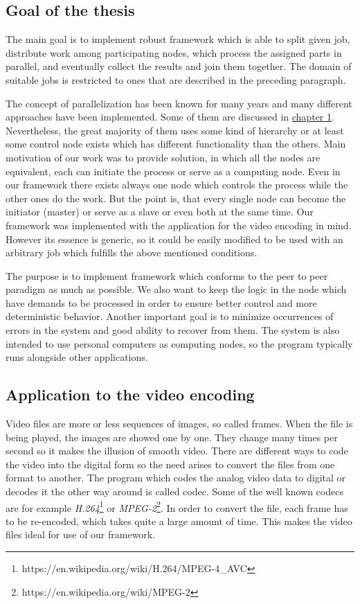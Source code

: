 \subsection*{Goal of the thesis} %
The main goal is to implement robust framework which is able to split given job, distribute work among participating nodes, which process the assigned parts in parallel, and eventually collect the results and join them together. The domain of suitable jobs is restricted to ones that are described in the preceding paragraph.

The concept of parallelization has been known for many years and many different approaches have been implemented. Some of them are discussed in \hyperref[existing-solutions]{chapter 1}. Nevertheless, the great majority of them uses some kind of hierarchy or at least some control node exists which has different functionality than the others. Main motivation of our work was to provide solution, in which all the nodes are equivalent, each can initiate the process or serve as a computing node. Even in our framework there exists always one node which controls the process while the other ones do the work. But the point is, that every single node can become the initiator (master) or serve as a slave or even both at the same time. Our framework was implemented with the application for the video encoding in mind. However its essence is generic, so it could be easily modified to be used with an arbitrary job which fulfills the above mentioned conditions.

The purpose is to implement framework which conforms to the peer to peer paradigm as much as possible. We also want to keep the logic in the node which have demands to be processed in order to ensure better control and more deterministic behavior. Another important goal is to minimize occurrences of errors in the system and good ability to recover from them. The system is also intended to use personal computers as computing nodes, so the program typically runs alongside other applications.


\subsection*{Application to the video encoding}
Video files are more or less sequences of images, so called frames. When the file is being played, the images are showed one by one. They change many times per second so it makes the illusion of smooth video. There are different ways to code the video into the digital form so the need arises to convert the files from one format to another. The program which codes the analog video data to digital or decodes it the other way around is called codec. Some of the well known codecs are for example \textit{H.264}\footnote{https://en.wikipedia.org/wiki/H.264/MPEG-4\_AVC} or \textit{MPEG-2}\footnote{https://en.wikipedia.org/wiki/MPEG-2}. In order to convert the file, each frame has to be re-encoded, which takes quite a large amount of time. This makes the video files ideal for use of our framework.

